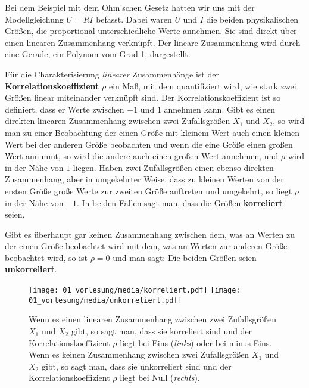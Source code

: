 Bei dem Beispiel mit dem Ohm'schen Gesetz hatten wir uns mit der Modellgleichung $U = R I$ befasst.
Dabei waren $U$ und $I$ die beiden physikalischen Größen, die proportional unterschiedliche Werte annehmen.
Sie sind direkt über einen linearen Zusammenhang verknüpft. Der lineare Zusammenhang
wird durch eine Gerade, ein Polynom vom Grad 1, dargestellt.

Für die Charakterisierung \textsl{linearer} Zusammenhänge ist der
\textbf{Korrelationskoeffizient} $\rho$ ein Maß, mit dem quantifiziert wird, wie
stark zwei Größen linear miteinander verknüpft sind.
Der Korrelationskoeffizient ist so definiert, dass er Werte zwischen $-1$ und
$1$ annehmen kann. Gibt es einen direkten linearen Zusammenhang zwischen zwei Zufallsgrößen
$X_1$ und $X_2$, so wird man zu einer Beobachtung der einen Größe mit kleinem Wert
auch einen kleinen Wert bei der anderen Größe beobachten und wenn die eine Größe einen
großen Wert annimmt, so wird die andere auch einen großen Wert annehmen, und
$\rho$ wird in der Nähe von $1$ liegen. Haben zwei Zufallsgrößen einen ebenso
direkten Zusammenhang, aber in umgekehrter Weise, dass zu kleinen Werten von der ersten
Größe große Werte zur zweiten Größe auftreten und umgekehrt, so liegt $\rho$ in der Nähe von $-1$.
In beiden Fällen sagt man, dass die Größen \textbf{korreliert} seien.

Gibt es überhaupt gar keinen Zusammenhang zwischen dem, was an Werten zu der einen Größe beobachtet
wird mit dem, was an Werten zur anderen Größe beobachtet wird, so ist $\rho = 0$ und man sagt:
Die beiden Größen seien \textbf{unkorreliert}.

\begin{figure}
	\begin{center}
		\texttt{[image: 01\_vorlesung/media/korreliert.pdf]} \hspace{5mm}
		\texttt{[image: 01\_vorlesung/media/unkorreliert.pdf]}
		\caption{\label{korrelation} Wenn es einen linearen Zusammenhang zwischen
			zwei Zufallsgrößen $X_1$ und $X_2$ gibt, so sagt man, dass sie korreliert sind
			und der Korrelationskoeffizient $\rho$ liegt bei Eins (\textsl{links}) oder bei
			minus Eins. Wenn es keinen Zusammenhang zwischen zwei Zufallsgrößen $X_1$ und $X_2$
			gibt, so sagt man, dass sie unkorreliert sind
			und der Korrelationskoeffizient $\rho$ liegt bei Null (\textsl{rechts}).}
	\end{center}
\end{figure}

